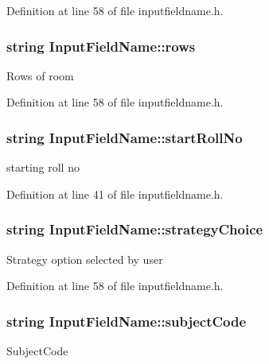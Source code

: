 Definition at line 58 of file inputfieldname.\-h.

\hypertarget{classInputFieldName_a1b5a819437f52b4bb6b0ea59f542f9a9}{
\subsubsection[{rows}]{\setlength{\rightskip}{0pt plus 5cm}string Input\-Field\-Name\-::rows}}\label{classInputFieldName_a1b5a819437f52b4bb6b0ea59f542f9a9}
Rows of room 

Definition at line 58 of file inputfieldname.\-h.

\hypertarget{classInputFieldName_a24baf5c915b4ee0fb8678e03adec043a}{
\subsubsection[{start\-Roll\-No}]{\setlength{\rightskip}{0pt plus 5cm}string Input\-Field\-Name\-::start\-Roll\-No}}\label{classInputFieldName_a24baf5c915b4ee0fb8678e03adec043a}
starting roll no 

Definition at line 41 of file inputfieldname.\-h.

\hypertarget{classInputFieldName_a9a6b827d404cb279cc0ed836c069e4a9}{
\subsubsection[{strategy\-Choice}]{\setlength{\rightskip}{0pt plus 5cm}string Input\-Field\-Name\-::strategy\-Choice}}\label{classInputFieldName_a9a6b827d404cb279cc0ed836c069e4a9}
Strategy option selected by user 

Definition at line 58 of file inputfieldname.\-h.

\hypertarget{classInputFieldName_af1cc6871c33344c365e6e25ea482bd48}{
\subsubsection[{subject\-Code}]{\setlength{\rightskip}{0pt plus 5cm}string Input\-Field\-Name\-::subject\-Code}}\label{classInputFieldName_af1cc6871c33344c365e6e25ea482bd48}
Subject\-Code 

